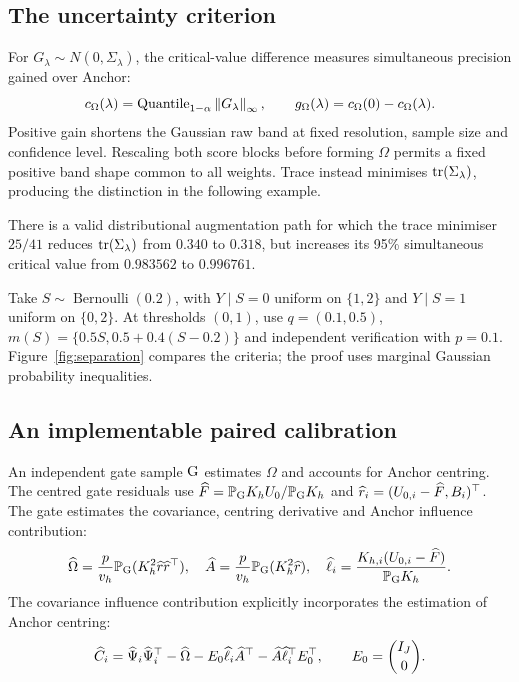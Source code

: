 \subsection{The uncertainty criterion}
For $G_\lambda\sim N(0,\Sigma_\lambda)$, the critical-value difference measures simultaneous precision gained over Anchor:
\begin{equation}\label{eq:gain}
 c_\Omega(\lambda)=\operatorname{Quantile}_{1-\alpha}\left\lVert G_\lambda\right\rVert_\infty,
 \qquad g_\Omega(\lambda)=c_\Omega(0)-c_\Omega(\lambda).
\end{equation}
Positive gain shortens the Gaussian raw band at fixed resolution, sample size and confidence level.
Rescaling both score blocks before forming $\Omega$ permits a fixed positive band shape common to all weights.
Trace instead minimises $\operatorname{tr}(\Sigma_\lambda)$, producing the distinction in the following example.

\begin{proposition}\label{prop:separation}
There is a valid distributional augmentation path for which the trace minimiser $25/41$ reduces $\operatorname{tr}(\Sigma_\lambda)$ from $0.340$ to $0.318$, but increases its 95\% simultaneous critical value from $0.983562$ to $0.996761$.
\end{proposition}
Take $S\sim\operatorname{Bernoulli}(0.2)$, with $Y\mid S=0$ uniform on $\{1,2\}$ and $Y\mid S=1$ uniform on $\{0,2\}$.
At thresholds $(0,1)$, use $q=(0.1,0.5)$, $m(S)=\{0.5S,0.5+0.4(S-0.2)\}$ and independent verification with $p=0.1$.
Figure~\ref{fig:separation} compares the criteria; the proof uses marginal Gaussian probability inequalities.



\subsection{An implementable paired calibration}
An independent gate sample $\mathrm{G}$ estimates $\Omega$ and accounts for Anchor centring.
The centred gate residuals use $\widehat F=\mathbb P_{\mathrm{G}}K_hU_0/\mathbb P_{\mathrm{G}}K_h$ and $\widehat r_i=(U_{0,i}-\widehat F,B_i)^\top$.
The gate estimates the covariance, centring derivative and Anchor influence contribution:
\begin{equation}\label{eq:moments}
 \widehat\Omega=\frac p{v_h}\mathbb P_{\mathrm{G}}(K_h^2\widehat r\widehat r^\top),\quad
 \widehat A=\frac p{v_h}\mathbb P_{\mathrm{G}}(K_h^2\widehat r),\quad
 \widehat\ell_i=\frac{K_{h,i}(U_{0,i}-\widehat F)}{\mathbb P_{\mathrm{G}}K_h}.
\end{equation}
The covariance influence contribution explicitly incorporates the estimation of Anchor centring:
\begin{equation}\label{eq:covif}
 \widehat C_i=\widehat\Psi_i\widehat\Psi_i^\top-\widehat\Omega
       -E_0\widehat\ell_i\widehat A^\top-\widehat A\widehat\ell_i^\top E_0^\top,
       \qquad E_0=\binom{I_J}{0}.
\end{equation}

